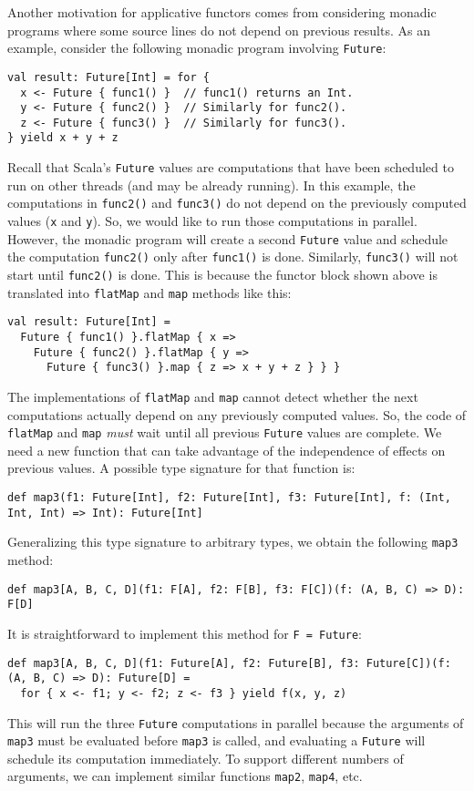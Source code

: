 Another motivation for applicative functors comes from considering
monadic programs where some source lines do not depend on previous
results. As an example, consider the following monadic program involving
\lstinline!Future!:
\begin{lstlisting}
val result: Future[Int] = for {
  x <- Future { func1() }  // func1() returns an Int.
  y <- Future { func2() }  // Similarly for func2().
  z <- Future { func3() }  // Similarly for func3().
} yield x + y + z
\end{lstlisting}
Recall that Scala\textsf{'}s \lstinline!Future! values are computations that
have been scheduled to run on other threads (and may be already running).
In this example, the computations in \lstinline!func2()! and \lstinline!func3()!
do not depend on the previously computed values (\lstinline!x! and
\lstinline!y!). So, we would like to run those computations in parallel.
However, the monadic program will create a second \lstinline!Future!
value and schedule the computation \lstinline!func2()! only after
\lstinline!func1()! is done. Similarly, \lstinline!func3()! will
not start until \lstinline!func2()! is done. This is because the
functor block shown above is translated into \lstinline!flatMap!
and \lstinline!map! methods like this:
\begin{lstlisting}
val result: Future[Int] =
  Future { func1() }.flatMap { x =>
    Future { func2() }.flatMap { y =>
      Future { func3() }.map { z => x + y + z } } }
\end{lstlisting}
The implementations of \lstinline!flatMap! and \lstinline!map! cannot
detect whether the next computations actually depend on any previously
computed values. So, the code of \lstinline!flatMap! and \lstinline!map!
\emph{must} wait until all previous \lstinline!Future! values are
complete. We need a new function that can take advantage of the independence
of effects on previous values. A possible type signature for that
function is:
\begin{lstlisting}
def map3(f1: Future[Int], f2: Future[Int], f3: Future[Int], f: (Int, Int, Int) => Int): Future[Int] 
\end{lstlisting}
Generalizing this type signature to arbitrary types, we obtain the
following \lstinline!map3! method:
\begin{lstlisting}
def map3[A, B, C, D](f1: F[A], f2: F[B], f3: F[C])(f: (A, B, C) => D): F[D]
\end{lstlisting}
It is straightforward to implement this method for \lstinline!F = Future!:
\begin{lstlisting}
def map3[A, B, C, D](f1: Future[A], f2: Future[B], f3: Future[C])(f: (A, B, C) => D): Future[D] =
  for { x <- f1; y <- f2; z <- f3 } yield f(x, y, z)
\end{lstlisting}
This will run the three \lstinline!Future! computations in parallel
because the arguments of \lstinline!map3! must be evaluated before
\lstinline!map3! is called, and evaluating a \lstinline!Future!
will schedule its computation immediately. To support different numbers
of arguments, we can implement similar functions \lstinline!map2!,
\lstinline!map4!, etc.

